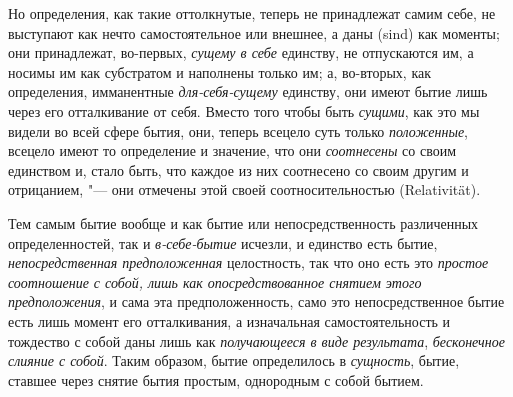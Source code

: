 Но определения, как такие оттолкнутые, теперь не принадлежат самим себе, не
выступают как нечто самостоятельное или внешнее, а даны (sind) как моменты; они
принадлежат, во-первых, {\em сущему в себе} единству, не отпускаются им, а
носимы им как субстратом и наполнены только им; а, во-вторых, как определения,
имманентные {\em для-себя-сущему} единству, они имеют бытие лишь через его
отталкивание от себя. Вместо того чтобы быть {\em сущими}, как это мы видели во
всей сфере бытия, они, теперь всецело суть только {\em положенные}, всецело
имеют то определение и значение, что они {\em соотнесены} со своим единством и,
стало быть, что каждое из них соотнесено со своим другим и отрицанием, "--- они
отмечены этой своей соотносительностью (Relativität).

Тем самым бытие вообще и как бытие или непосредственность различенных
определенностей, так и {\em в-себе-бытие} исчезли, и единство есть бытие,
{\em непосредственная предположенная} целостность, так что оно есть это
{\em простое соотношение с собой, лишь как опосредствованное снятием
этого предположения}, и сама эта предположенность, само это непосредственное
бытие есть лишь момент его отталкивания, а изначальная самостоятельность и
тождество с собой даны лишь как {\em получающееся в виде результата},
{\em бесконечное слияние с собой}. Таким образом, бытие определилось в
{\em сущность}, бытие, ставшее через снятие бытия простым, однородным с собой
бытием.

